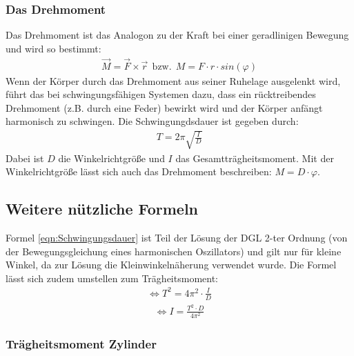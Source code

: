 \subsubsection{Das Drehmoment}

Das Drehmoment ist das Analogon zu der Kraft bei einer geradlinigen Bewegung und wird so bestimmt:
\begin{align}
    \label{eqn:Drehmoment}
    \vec{M} = \vec{F} \times \vec{r} \:\: \mathrm{bzw.} \:\: M = F \cdot r \cdot sin(\varphi)
\end{align}
Wenn der Körper durch das Drehmoment aus seiner Ruhelage ausgelenkt wird, führt das bei schwingungsfähigen Systemen dazu,
dass ein rücktreibendes Drehmoment (z.B. durch eine Feder) bewirkt wird und der Körper anfängt harmonisch zu schwingen. Die Schwingungdsdauer
ist gegeben durch:
\begin{align}
    \label{eqn:Schwingungsdauer}
    T = 2\pi \sqrt{\frac{I}{D}}
\end{align}
Dabei ist $D$ die Winkelrichtgröße und $I$ das Gesamtträgheitsmoment. Mit der Winkelrichtgröße lässt sich auch das Drehmoment beschreiben: $M = D \cdot \varphi$.
\\

\subsection{Weitere nützliche Formeln}

Formel \ref{eqn:Schwingungsdauer} ist Teil der Lösung der DGL 2-ter Ordnung (von der Bewegungsgleichung eines harmonischen Oszillators) und gilt nur für kleine
 Winkel, da zur Lösung die Kleinwinkelnäherung verwendet wurde.
Die Formel lässt sich zudem umstellen zum Trägheitsmoment:
\begin{align}
    \label{eqn:T}
    \Leftrightarrow T^2 = 4\pi^2 \cdot \frac{I}{D} 
\end{align}
\begin{align}
    \label{eqn:I(T)}
    \Leftrightarrow I = \frac{T^2 \cdot D}{4\pi^2}
\end{align}

\subsubsection{Trägheitsmoment Zylinder}

